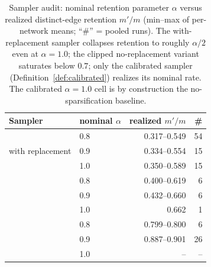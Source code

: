 \begin{table}[t]
\centering
\setlength{\tabcolsep}{5pt}
\caption{Sampler audit: nominal retention parameter $\alpha$ versus realized distinct-edge
retention $m'/m$ (min--max of per-network means; ``\#'' = pooled runs).
The with-replacement sampler collapses retention to roughly $\alpha/2$ even at $\alpha=1.0$;
the clipped no-replacement variant saturates below $0.7$; only the calibrated sampler
(Definition~\ref{def:calibrated}) realizes its nominal rate.
The calibrated $\alpha = 1.0$ cell is by construction the no-sparsification baseline.}
\label{tab:sampler_audit}
\footnotesize
\begin{tabular}{llrr}
\toprule
Sampler & nominal $\alpha$ & realized $m'/m$ & \# \\
\midrule
\multirow{3}{*}{with replacement} & 0.8 & 0.317--0.549 & 54 \\
 & 0.9 & 0.334--0.554 & 15 \\
 & 1.0 & 0.350--0.589 & 15 \\
\addlinespace[2pt]
\multirow{3}{*}{no replacement (clipped)} & 0.8 & 0.400--0.619 & 6 \\
 & 0.9 & 0.432--0.660 & 6 \\
 & 1.0 & 0.662 & 1 \\
\addlinespace[2pt]
\multirow{3}{*}{calibrated (Def.~\ref{def:calibrated})} & 0.8 & 0.799--0.800 & 6 \\
 & 0.9 & 0.887--0.901 & 26 \\
 & 1.0 & -- & -- \\
\bottomrule
\end{tabular}
\end{table}
